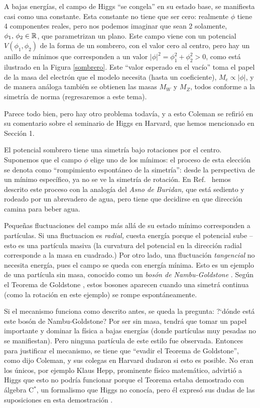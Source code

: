 A bajas energ\'ias, el campo de Higgs ``se congela'' en su estado
base, se manifiesta casi como una constante. Esta constante no
tiene que ser cero: realmente $\phi$ tiene 4 componentes reales, pero
nos podemos imaginar que sean 2 solamente,
$\phi_1 , \, \phi_2 \in \mathbb{R}$, que parametrizan un plano.
Este campo viene con un potencial $V(\phi_1, \phi_2)$ de la forma
de un sombrero, con el valor cero al centro, pero hay un anillo
de m\'inimos que corresponden a un valor
$|\phi|^2 = \phi_1^2 + \phi_2^2 > 0$, como est\'a ilustrado en la
Figura \ref{sombrero}.
Este ``valor esperado en el vac\'io'' toma el papel de la masa
del electr\'on que el modelo necesita (hasta un coeficiente),
$M_e \propto |\phi|$, y de manera an\'aloga tambi\'en se obtienen
las masas $M_W$ y $M_Z$, todos conforme a la simetr\'ia de norma
(regresaremos a este tema).

Parece todo bien, pero hay otro problema todav\'ia, y a esto
Coleman se refiri\'o en su comentario sobre el seminario de
Higgs en Harvard, que hemos mencionado en Secci\'on 1.

El potencial sombrero tiene una simetr\'ia bajo rotaciones por
el centro. Suponemos que el campo $\phi$ elige uno de
los m\'inimos: el proceso de esta elecci\'on se denota como
``rompimiento espont\'aneo de la simetr\'ia'': desde
la perspectiva de un m\'inimo espec\'ifico, ya no se ve la
simetr\'ia de rotaci\'on. En Ref.\ \cite{HiggsBol} hemos
descrito este proceso con la analog\'ia del {\em Asno de Buridan,}
que est\'a sediento y rodeado por un abrevadero de agua, pero
tiene que decidirse en que direcci\'on camina para beber agua.

Peque\~nas fluctuaciones del campo m\'as all\'a de su estado
m\'inimo corresponden a part\'iculas. Si una fluctuacion es
{\em radial,} cuesta energ\'ia porque el potencial sube -- esto
es una part\'icula masiva (la curvatura del potencial en la
direcci\'on radial corresponde a la masa en cuadrado.)
Por otro lado, una fluctuaci\'on {\em tangencial} no necesita
energ\'ia, pues el campo se queda con energ\'ia m\'inima.
Esto es un ejemplo de una part\'icula sin masa, conocido
como un {\em bos\'on de Nambu-Goldstone} \cite{Nambu,Goldstone}.
Seg\'un el Teorema de Goldstone \cite{GSW}, estos bosones aparecen
cuando una simetr\'a continua (como la rotaci\'on en este
ejemplo) se rompe espont\'aneamente.

Si el mecanismo funciona como descrito antes, se queda la
pregunta: ?`d\'onde est\'a este bos\'on de Nambu-Goldstone?
Por ser sin masa, tendr\'a que tomar un papel importante
y dominar la f\'isica a bajas energ\'ias (donde part\'iculas
muy pesadas no se manifiestan). Pero ninguna part\'icula de
este estilo fue observada. Entonces para justificar el mecanismo,
se tiene que ``evadir el Teorema de Goldstone'', como dijo
Coleman, y sus colegas en Harvard dudaron si esto es posible.
No eran los \'unicos, por ejemplo Klaus Hepp, prominente
f\'isico matem\'atico, advirti\'o a Higgs que esto no podr\'ia
funcionar porque el Teorema estaba demostrado con \'algebra
C$^{*}$, un formalismo que Higgs no conoc\'ia, pero \'el expres\'o
sus dudas de las suposiciones en esta demostraci\'on \cite{boson}.

